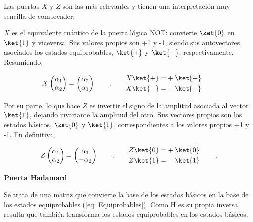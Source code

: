 \documentclass[11pt,a4paper,twoside,pdf]{article}
\numberwithin{equation}{section}
\begin{document}
			Las puertas $X$ y $Z$ son las más relevantes y tienen una interpretación muy sencilla de comprender:
		
			$X$ es el equivalente cuántico de la puerta lógica NOT: convierte $\ket{0} $ en $\ket{1}$ y viceversa. Sus valores propios son +1 y -1, siendo sus autovectores asociados los estados equiprobables, $\ket{+} $ y $\ket{-} $, respectivamente. Resumiendo:
			
				\begin{equation} \label{eq: Pauli X}
					X \left( \begin{matrix} \alpha_1 \\ \alpha_2 \end{matrix} \right) =  \left( \begin{matrix} \alpha_2 \\ \alpha_1 \end{matrix} \right)			\qquad , \qquad
					\begin{aligned}X\ket{+} =&+\ket{+}  \\X\ket{-} =&-\ket{-} \end{aligned}	\qquad 	
				\end{equation}	
		
			Por su parte, lo que hace $Z$ es invertir el signo de la amplitud asociada al vector $\ket{1} $, dejando invariante la amplitud del otro. Sus vectores propios son los estados básicos, $\ket{0}$ y $\ket{1}$, correspondientes a los valores propios +1 y -1. En definitiva,
			
			\begin{equation} \label{eq: Pauli Z}
				Z  \left( \begin{matrix} \alpha_1 \\ \alpha_2 \end{matrix} \right) =  \left( \begin{matrix} \alpha_1 \\ - \alpha_2 \end{matrix} \right)			\qquad , \qquad
				\begin{aligned}Z\ket{0} =&+\ket{0}  \\Z\ket{1} =&-\ket{1} \end{aligned}		\;\qquad.			
			\end{equation}	
			
		\begin{flushleft}{\textbf{Puerta Hadamard}}\end{flushleft}
			
			Se trata de una matriz que convierte la base de los estados básicos en la base de los estados equiprobables (\ref{eq: Equiprobables}). Como H es su propia inversa, resulta que también transforma los estados equiprobables en los estados básicos:
			
\end{document}
